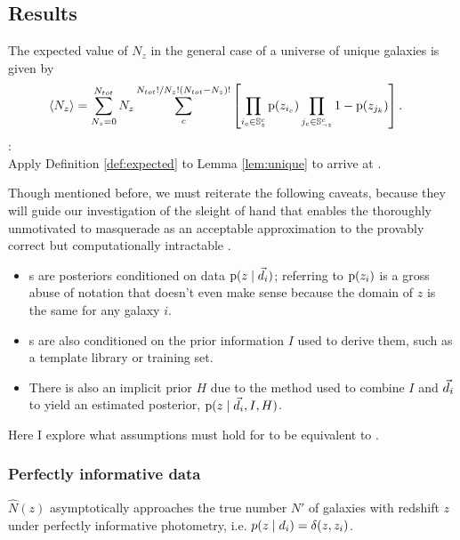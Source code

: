 \subsection{Results}

\begin{theorem}\label{thm:general}
	The expected value of $N_{z}$ in the general case of a universe of unique galaxies is given by
	\begin{align}
	\eqlabel{eq:complete}
	\langle N_{z} \rangle &= \sum_{N_{z} = 0}^{N_{tot}} N_{z} \sum_{c}^{N_{tot}! / N_{z}! (N_{tot} - N_{z})!} \left[ \prod_{i_{c} \in \mathbb{S}^{c}_{z}} \pr{z_{i_{c}}} \prod_{j_{c} \in \mathbb{S}^{c}_{\lnot z}} 1 - \pr{z_{j_{k}}} \right].
	\end{align}
	:\\
	Apply Definition \ref{def:expected} to Lemma \ref{lem:unique} to arrive at .
\end{theorem}

Though mentioned before, we must reiterate the following caveats, because they will guide our investigation of the sleight of hand that enables the thoroughly unmotivated  to masquerade as an acceptable approximation to the provably correct but computationally intractable .
\begin{itemize}
	\item \Pzpdf s are posteriors conditioned on data $\mathrm{p}(z \mid \vec{d}_{i})$; referring to $\mathrm{p}(z_{i})$ is a gross abuse of notation that doesn't even make sense because the domain of $z$ is the same for any galaxy $i$.
	\item \Pzpdf s are also conditioned on the prior information $I$ used to derive them, such as a template library or training set.
	\item There is also an implicit prior $H$ due to the method used to combine $I$ and $\vec{d}_{i}$ to yield an estimated posterior, $\mathrm{p}(z \mid \vec{d}_{i}, I, H)$.
\end{itemize}
Here I explore what assumptions must hold for  to be equivalent to .

\subsubsection{Perfectly informative data}


\begin{theorem}
	$\hat{N}(z)$ asymptotically approaches the true number $N'$ of galaxies with redshift $z$ under perfectly informative photometry, i.e. $p(z \mid d_{i}) = \delta(z, z_{i})$.
\end{theorem}

